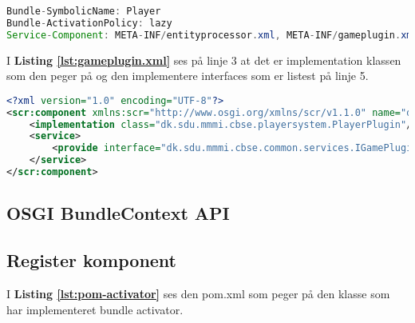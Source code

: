 \hfill \linebreak \hline 
{}
\hline \hfill \linebreak

\begin{lstlisting}[caption={osgi.bnd}, label={lst:osgi.bnd}, language=java]
Bundle-SymbolicName: Player
Bundle-ActivationPolicy: lazy
Service-Component: META-INF/entityprocessor.xml, META-INF/gameplugin.xml
\end{lstlisting}

I \textbf{Listing \ref{lst:gameplugin.xml}} ses på linje 3 at det er
implementation klassen som den peger på og den implementere interfaces som er
listest på linje 5.

\begin{lstlisting}[caption={gameplugin.xml}, label={lst:gameplugin.xml}, language=xml]
<?xml version="1.0" encoding="UTF-8"?>
<scr:component xmlns:scr="http://www.osgi.org/xmlns/scr/v1.1.0" name="dk.sdu.mmmi.cbse.playersystem.plugin">
    <implementation class="dk.sdu.mmmi.cbse.playersystem.PlayerPlugin"/>
    <service>
        <provide interface="dk.sdu.mmmi.cbse.common.services.IGamePluginService"/>
    </service>
</scr:component>
\end{lstlisting}


\newpage
\subsection{OSGI BundleContext API}

\hfill \linebreak \hline 
{}
\hline \hfill \linebreak

\subsection{Register komponent}

I \textbf{Listing \ref{lst:pom-activator}} ses den pom.xml som peger på den
klasse som har implementeret bundle activator.

